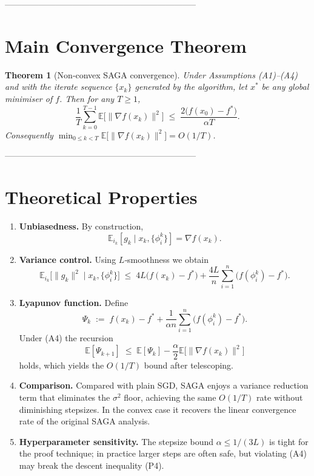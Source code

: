 \documentclass{article}
\newtheorem{theorem}{Theorem}
\newcommand{\E}{\mathbb{E}}
\begin{document}
--------------------------------------------------------------------

\section*{Main Convergence Theorem}
\begin{theorem}[Non‑convex SAGA convergence]\label{thm:saga}
Under Assumptions (A1)–(A4) and with the iterate sequence $\{x_k\}$ generated by
the algorithm, let $x^{*}$ be any global minimiser of $f$. Then for any
$T\ge 1$,
\[
\frac{1}{T}\sum_{k=0}^{T-1}\E\!\bigl[\|\nabla f(x_k)\|^{2}\bigr]
\;\le\;
\frac{2\bigl(f(x_0)-f^{*}\bigr)}{\alpha T}.
\tag{4}
\]
Consequently $\min_{0\le k<T}\E\!\bigl[\|\nabla f(x_k)\|^{2}\bigr]=O(1/T)$.
\end{theorem}

--------------------------------------------------------------------

\section*{Theoretical Properties}
\begin{enumerate}[label=\arabic*.]
\item \textbf{Unbiasedness.} By construction,
\[
\E_{i_k}[g_k\mid x_k,\{\phi_i^k\}]=\nabla f(x_k).
\tag{P1}
\]
\item \textbf{Variance control.} Using $L$‑smoothness we obtain
\[
\E_{i_k}\!\bigl[\|g_k\|^{2}\mid x_k,\{\phi_i^k\}\bigr]
\;\le\;
4L\bigl(f(x_k)-f^{*}\bigr)
   +\frac{4L}{n}\sum_{i=1}^{n}\bigl(f(\phi_i^k)-f^{*}\bigr).
\tag{P2}
\]
\item \textbf{Lyapunov function.} Define
\[
\Psi_k \;:=\; f(x_k)-f^{*}
   +\frac{1}{\alpha n}\sum_{i=1}^{n}\bigl(f(\phi_i^k)-f^{*}\bigr).
\tag{P3}
\]
Under (A4) the recursion
\[
\E[\Psi_{k+1}]\;\le\;\E[\Psi_{k}]
          -\frac{\alpha}{2}\E\!\bigl[\|\nabla f(x_k)\|^{2}\bigr]
\tag{P4}
\]
holds, which yields the $O(1/T)$ bound after telescoping.

\item \textbf{Comparison.} Compared with plain SGD, SAGA enjoys a
variance reduction term that eliminates the $\sigma^{2}$ floor, achieving
the same $O(1/T)$ rate without diminishing stepsizes. In the convex case it
recovers the linear convergence rate of the original SAGA analysis.

\item \textbf{Hyperparameter sensitivity.} The stepsize bound $\alpha\le 1/(3L)$
is tight for the proof technique; in practice larger steps are often safe,
but violating (A4) may break the descent inequality (P4).
\end{enumerate}
\end{document}
